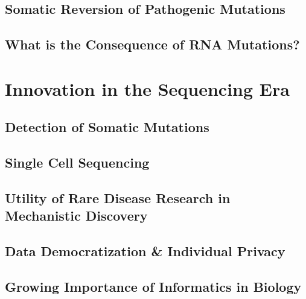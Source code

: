 \subsection{Somatic Reversion of Pathogenic Mutations}
\subsection{What is the Consequence of RNA Mutations?} 

\section{Innovation in the Sequencing Era}
\subsection{Detection of Somatic Mutations}
\subsection{Single Cell Sequencing}
\subsection{Utility of Rare Disease Research in Mechanistic Discovery}
\subsection{Data Democratization \& Individual Privacy}
\subsection{Growing Importance of Informatics in Biology}